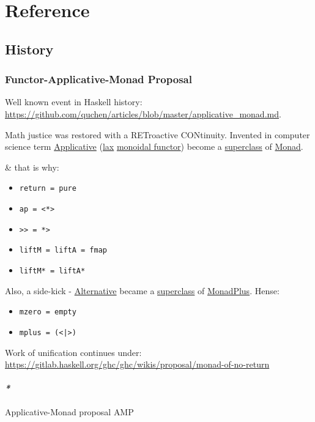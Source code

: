 \documentclass[a4paper,14pt,oneside]{book}
\begin{document}
\part{Reference}
\label{sec:org45386aa}

\chapter{History}
\label{sec:org2d9f381}
\section{\label{org8e14c72}Functor-Applicative-Monad Proposal}
\label{sec:org0043645}
Well known event in Haskell history: \url{https://github.com/quchen/articles/blob/master/applicative\_monad.md}.

Math justice was restored with a RETroactive CONtinuity. Invented in computer science term \hyperref[orgc8d9799]{Applicative} (\hyperref[org92dd210]{lax} \hyperref[org625963c]{monoidal functor}) become a \hyperref[orge67665e]{superclass} of \hyperref[org52f483f]{Monad}.

\& that is why:
\begin{itemize}
\item \texttt{return = pure}
\item \texttt{ap = <*>}
\item \texttt{>> = *>}
\item \texttt{liftM = liftA = fmap}
\item \texttt{liftM* = liftA*}
\end{itemize}

Also, a side-kick - \hyperref[org140e25f]{Alternative} became a \hyperref[orge67665e]{superclass} of \hyperref[org538c525]{MonadPlus}. Hense:
\begin{itemize}
\item \texttt{mzero = empty}
\item \texttt{mplus = (<|>)}
\end{itemize}

Work of unification continues under: \url{https://gitlab.haskell.org/ghc/ghc/wikis/proposal/monad-of-no-return}

\subsection{\emph{*}}
\label{sec:org85071b0}

\label{org314bd58}Applicative-Monad proposal
\label{org631d9f5}AMP
\end{document}

